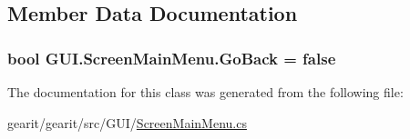 \subsection{Member Data Documentation}
\hypertarget{class_g_u_i_1_1_screen_main_menu_a69efd8b9aa3aa8716ddb37e0a00a5e2b}{
\subsubsection[{Go\+Back}]{\setlength{\rightskip}{0pt plus 5cm}bool G\+U\+I.\+Screen\+Main\+Menu.\+Go\+Back = false\hspace{0.3cm}{\ttfamily [static]}}}\label{class_g_u_i_1_1_screen_main_menu_a69efd8b9aa3aa8716ddb37e0a00a5e2b}


The documentation for this class was generated from the following file\+:\begin{DoxyCompactItemize}
\item 
gearit/gearit/src/\+G\+U\+I/\hyperlink{_screen_main_menu_8cs}{Screen\+Main\+Menu.\+cs}\end{DoxyCompactItemize}

